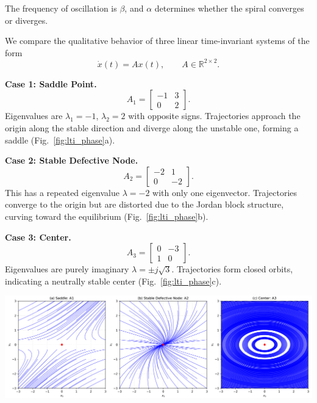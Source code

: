 The frequency of oscillation is $\beta$, and $\alpha$ determines whether the spiral converges or diverges.

\begin{example}

We compare the qualitative behavior of three linear time-invariant systems of the form
\[
\dot{x}(t) = A x(t), \qquad A \in \mathbb{R}^{2\times 2}.
\]

\textbf{Case 1: Saddle Point.}  
\[
A_1 = \begin{bmatrix} -1 & 3 \\ 0 & 2 \end{bmatrix}.
\]
Eigenvalues are $\lambda_1=-1$, $\lambda_2=2$ with opposite signs.  
Trajectories approach the origin along the stable direction and diverge along the unstable one, forming a saddle (Fig.~\ref{fig:lti_phase}a).

\textbf{Case 2: Stable Defective Node.}  
\[
A_2 = \begin{bmatrix} -2 & 1 \\ 0 & -2 \end{bmatrix}.
\]
This has a repeated eigenvalue $\lambda=-2$ with only one eigenvector.  
Trajectories converge to the origin but are distorted due to the Jordan block structure, curving toward the equilibrium (Fig.~\ref{fig:lti_phase}b).

\textbf{Case 3: Center.}  
\[
A_3 = \begin{bmatrix} 0 & -3 \\ 1 & 0 \end{bmatrix}.
\]
Eigenvalues are purely imaginary $\lambda = \pm j\sqrt{3}$.  
Trajectories form closed orbits, indicating a neutrally stable center (Fig.~\ref{fig:lti_phase}c).

    \centering
    \includegraphics[width=\linewidth]{Images/nonlinear/introduction/phase_dense.png}
    \label{fig:lti_phase}
\end{example}


